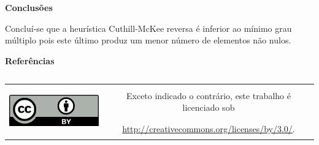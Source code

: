 \documentclass[]{beamer}
\begin{document}
\begin{frame}[t,fragile]
\begin{columns}[t]
\begin{column}{0.4\textwidth}
  \textbf{Conclusões}

  Concluí-se que a heurística Cuthill-McKee reversa é inferior ao mínimo grau
  múltiplo pois este último produz um menor número de elementos não nulos.

    \textbf{Referências}

    \printbibliography
    \end{column}
  \end{columns}

  \vfill
  \begin{center}
    \begin{tabular}[]{cc}
      \multirow{2}{*}{\includegraphics[height=60pt]{figures/cc-by}} &
      \Large{Exceto indicado o contrário, este trabalho é licenciado sob}\\
      & \Large{\url{http://creativecommons.org/licenses/by/3.0/}.}
    \end{tabular}
  \end{center}
\end{frame}
\end{document}
